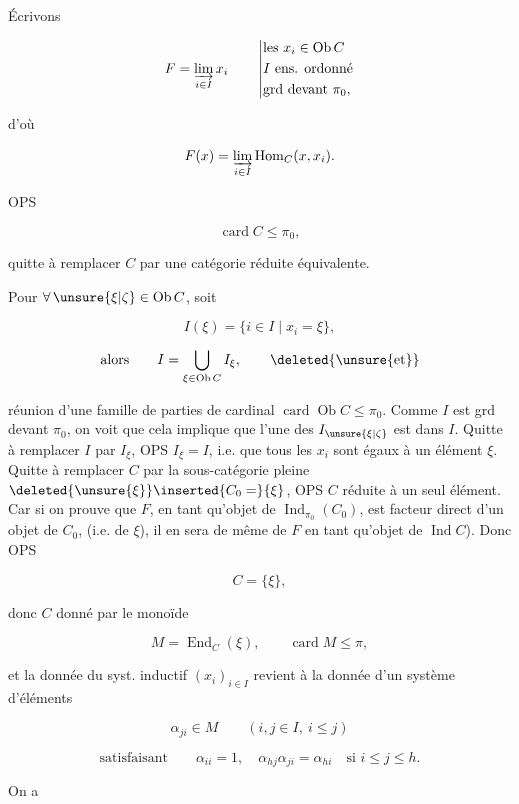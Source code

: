 Écrivons

\[
F=\varinjlim_{i\in I}x_i\qquad \left|\begin{aligned}&\text{les }x_i\in\operatorname{Ob}C\\ &I\ \text{ens. ordonné}\\ &\text{grd devant }\pi_0,\end{aligned}\right.
\]

d'où

\[
F(x)=\varinjlim_{i\in I}\operatorname{Hom}_C(x,x_i).
\]

OPS

\[
\operatorname{card}C\leq\pi_0,
\]

quitte à remplacer $C$ par une catégorie réduite équivalente.

Pour $\forall\,\unsure{\xi|\zeta}\in\operatorname{Ob}C$, soit 

\[
I(\xi)=\{i\in I\mid x_i=\xi\},
\]

\[
\text{alors}\qquad I=\bigcup_{\xi\in\operatorname{Ob}C}I_\xi,\qquad\deleted{\unsure{\text{et}}}
\]

réunion d'une famille de parties  de cardinal $\operatorname{card}\operatorname{Ob}C\leq\pi_0$. Comme $I$ est grd devant $\pi_0$, on voit que cela implique que l'une des $I_{\unsure{\xi|\zeta}}$ est  dans $I$. Quitte à remplacer $I$ par $I_\xi$, OPS $I_\xi=I$, i.e. que tous les $x_i$ sont égaux à un  élément $\xi$. Quitte à remplacer $C$ par la sous-catégorie pleine $\deleted{\unsure{\xi}}\inserted{C_0=} \{\xi\}$, OPS $C$ réduite à un seul élément. \unsure{[|(}Car si on prouve que $F$, en tant qu'objet de $\operatorname{Ind}_{\pi_0}(C_0)$, est facteur direct d'un objet de $C_0$, (i.e. de $\xi$), il en sera de même de $F$ en tant qu'objet de $\operatorname{Ind} C$). Donc OPS

\[
C=\{\xi\},
\]

donc $C$ donné par le monoïde

\[
M=\operatorname{End}_C(\xi),\qquad \operatorname{card} M\leq\pi,
\]

et la donnée du syst. inductif $(x_i)_{i\in I}$ revient à la donnée d'un système d'éléments

\[
\alpha_{ji}\in M\qquad (i,j\in I,\ i\leq j)
\]

\[
\text{satisfaisant}\qquad\alpha_{ii}=1,\quad\alpha_{hj}\alpha_{ji}=\alpha_{hi}\quad\text{si }i\leq j\leq h.
\]

On a

